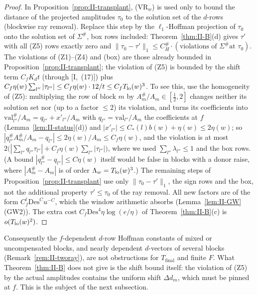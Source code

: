 \documentclass[10pt]{amsart}
\theoremstyle{definition}
\theoremstyle{remark}
\begin{document}
\begin{proof}
In Proposition~\ref{prop:II-transplant}, (VR$_w$) is used only to bound the distance
of the projected amplitudes $\tau_0$ to the solution set of the $d$-rows
(blockwise ray removal).  Replace this step by the $\ell_1$-Hoffman
projection of $\tau_0$ onto the solution set of $\Sigma^\#$, box rows
included: Theorem~\ref{thm:II-B}(d) gives $\tau'$ with all (Z5) rows exactly
zero and $\|\tau_0-\tau'\|_1\le C^\#_H\cdot(\text{violations of }\Sigma^\#\text{
at }\tau_0)$.  The violations of (Z1)--(Z4) and (box) are those already
bounded in Proposition~\ref{prop:II-transplant}; the violation of (Z5) is bounded by
the shift term $C_fK_dt$ (through [I,~(17)]) plus $C_f\eta(w)\sum_{l''}
|\tau_{l''}|\le C_f\eta(w)\cdot12/t\le C_fT_{\rm lo}(w)^3$.  To see this, use
the homogeneity of (Z5): multiplying the row of block $m$ by $A^\#_m/A_m\in
[\frac12,2]$ changes neither its solution set nor (up to a factor $\le2$) its
violation, and turns its coefficients into $\mathrm{val}^\#_{l''}/A_m=
q_{l''}+x'_{l''}/A_m$ with $q_{l''}=\mathrm{val}_{l''}/A_m$ the coefficients
at $f$ (Lemma~\ref{lem:II-status}(d)) and $|x'_{l''}|\le C_*(l)b(w)+\eta(w)
\le2\eta(w)$; so $|q^\#_{l''}A^\#_m/A_m-q_{l''}|\le2\eta(w)/A_m\le C_f\eta(w)$,
and the violation is at most $2\big(|\sum_{l''}q_{l''}\tau_{l''}|+C_f\eta(w)
\sum_{l''}|\tau_{l''}|\big)$, where we used $\sum_{l''}\lambda_{l''}\le1$ and
the box rows.  (A bound $|q^\#_{l''}-q_{l''}|\le C\eta(w)$ itself would be
false in blocks with a donor raise, where $|A^\#_m-A_m|$ is of order
$\Lambda_w=T_{\rm lo}(w)^3$.)  The remaining steps
of Proposition~\ref{prop:II-transplant} use only $\|\tau_0-\tau'\|_1$, the sign rows
and the box, not the additional property $\tau'\le\tau_0$ of the ray removal.
All new factors are of the form $C_f^l\mathrm{Des}^{C}u^{-C}$, which the window
arithmetic absorbs (Lemma~\ref{lem:II-GW}(GW2)).  The extra cost
$C_f\mathrm{Des}^4\eta\log(e/\eta)$ of Theorem~\ref{thm:II-B}(c) is
$o(T_{\rm lo}(w)^2)$.
\end{proof}

Consequently the $f$-dependent $d$-row Hoffman constants of mixed or
uncompensated blocks, and nearly dependent $d$-vectors of several blocks
(Remark~\ref{rem:II-tworay}), are not obstructions for $T_{\mathrm{final}}$
and finite $F$.  What Theorem~\ref{thm:II-B} does not give is the shift bound
itself: the violation of (Z5) by the actual amplitudes contains the uniform
shift $\Delta d_m$, which must be pinned at $f$.  This is the subject of the
next subsection.
\end{document}
